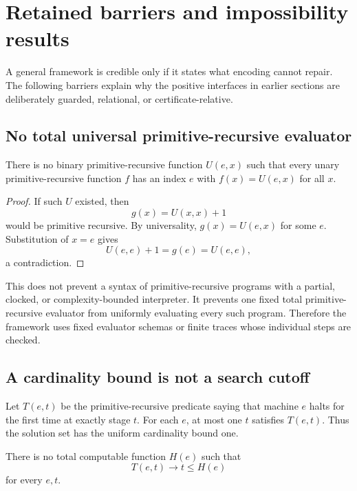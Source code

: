 \section{Retained barriers and impossibility results}
\label{sec:barriers}

A general framework is credible only if it states what encoding cannot repair.
The following barriers explain why the positive interfaces in earlier sections
are deliberately guarded, relational, or certificate-relative.

\subsection{No total universal primitive-recursive evaluator}

\begin{theorem}
\label{thm:no-universal-pr}
There is no binary primitive-recursive function \(U(e,x)\) such that every
unary primitive-recursive function \(f\) has an index \(e\) with
\(f(x)=U(e,x)\) for all \(x\).
\end{theorem}

\begin{proof}
If such \(U\) existed, then
\[
 g(x)=U(x,x)+1
\]
would be primitive recursive.  By universality, \(g(x)=U(e,x)\) for some
\(e\).  Substitution of \(x=e\) gives
\[
 U(e,e)+1=g(e)=U(e,e),
\]
a contradiction.
\end{proof}

This does not prevent a syntax of primitive-recursive programs with a
partial, clocked, or complexity-bounded interpreter.  It prevents one fixed
total primitive-recursive evaluator from uniformly evaluating every such
program.  Therefore the framework uses fixed evaluator schemas or finite
traces whose individual steps are checked.

\subsection{A cardinality bound is not a search cutoff}

Let \(T(e,t)\) be the primitive-recursive predicate saying that machine \(e\)
halts for the first time at exactly stage \(t\).  For each \(e\), at most one
\(t\) satisfies \(T(e,t)\).  Thus the solution set has the uniform cardinality
bound one.

\begin{theorem}
\label{thm:cardinality-no-cutoff}
There is no total computable function \(H(e)\) such that
\[
 T(e,t)\to t\le H(e)
\]
for every \(e,t\).
\end{theorem}

